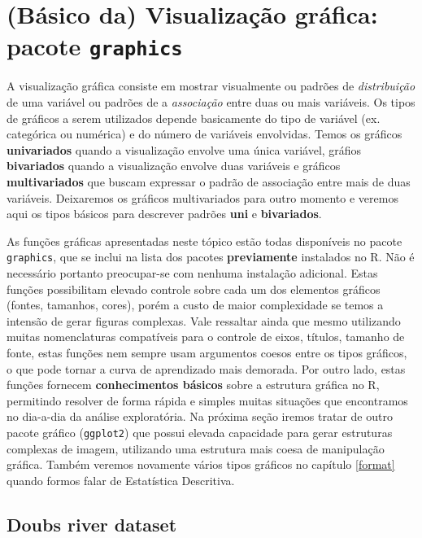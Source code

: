 \documentclass[
]{book}
\begin{document}
\hypertarget{visualizacao}{%
\chapter{\texorpdfstring{(Básico da) Visualização gráfica: pacote \texttt{graphics}}{(Básico da) Visualização gráfica: pacote graphics}}\label{visualizacao}}

A visualização gráfica consiste em mostrar visualmente ou padrões de \emph{distribuição} de uma variável ou padrões de a \emph{associação} entre duas ou mais variáveis. Os tipos de gráficos a serem utilizados depende basicamente do tipo de variável (ex. categórica ou numérica) e do número de variáveis envolvidas. Temos os gráficos \textbf{univariados} quando a visualização envolve uma única variável, gráfios \textbf{bivariados} quando a visualização envolve duas variáveis e gráficos \textbf{multivariados} que buscam expressar o padrão de associação entre mais de duas variáveis. Deixaremos os gráficos multivariados para outro momento e veremos aqui os tipos básicos para descrever padrões \textbf{uni} e \textbf{bivariados}.

As funções gráficas apresentadas neste tópico estão todas disponíveis no pacote \texttt{graphics}, que se inclui na lista dos pacotes \textbf{previamente} instalados no R. Não é necessário portanto preocupar-se com nenhuma instalação adicional. Estas funções possibilitam elevado controle sobre cada um dos elementos gráficos (fontes, tamanhos, cores), porém a custo de maior complexidade se temos a intensão de gerar figuras complexas. Vale ressaltar ainda que mesmo utilizando muitas nomenclaturas compatíveis para o controle de eixos, títulos, tamanho de fonte, estas funções nem sempre usam argumentos coesos entre os tipos gráficos, o que pode tornar a curva de aprendizado mais demorada. Por outro lado, estas funções fornecem \textbf{conhecimentos básicos} sobre a estrutura gráfica no R, permitindo resolver de forma rápida e simples muitas situações que encontramos no dia-a-dia da análise exploratória. Na próxima seção iremos tratar de outro pacote gráfico (\texttt{ggplot2}) que possui elevada capacidade para gerar estruturas complexas de imagem, utilizando uma estrutura mais coesa de manipulação gráfica. Também veremos novamente vários tipos gráficos no capítulo \ref{format} quando formos falar de Estatística Descritiva.

\hypertarget{doubs-river-dataset}{%
\section{Doubs river dataset}\label{doubs-river-dataset}}
\end{document}
